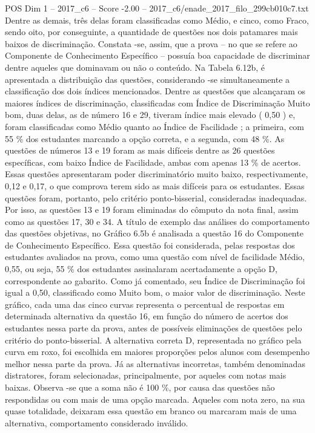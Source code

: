 \begin{textsample}{POS Dim 1 – 2017\_c6 – Score -2.00 – 2017\_c6/enade\_2017\_filo\_299cb010c7.txt}
Dentre as demais, três delas foram classificadas como Médio, e cinco, como Fraco, sendo oito, por conseguinte, a quantidade de questões nos dois patamares mais baixos de discriminação.
Constata -se, assim, que a prova – no que se refere ao Componente de Conhecimento Específico – possuía boa capacidade de discriminar dentre aqueles que dominavam ou não o conteúdo.
Na Tabela 6.12b, é apresentada a distribuição das questões, considerando -se simultaneamente a classificação dos dois índices mencionados.
Dentre as questões que alcançaram os maiores índices de discriminação, classificadas com Índice de Discriminação Muito bom, duas delas, as de número 16 e 29, tiveram índice mais elevado ( 0,50 ) e, foram classificadas como Médio quanto ao Índice de Facilidade ; a primeira, com 55 \% dos estudantes marcando a opção correta, e a segunda, com 48 \%.
As questões de números 13 e 19 foram as mais difíceis dentre as 26 questões específicas, com baixo Índice de Facilidade, ambas com apenas 13 \% de acertos.
Essas questões apresentaram poder discriminatório muito baixo, respectivamente, 0,12 e 0,17, o que comprova terem sido as mais difíceis para os estudantes.
Essas questões foram, portanto, pelo critério ponto-bisserial, consideradas inadequadas.
Por isso, as questões 13 e 19 foram eliminadas do cômputo da nota final, assim como as questões 17, 30 e 34.
A título de exemplo das análises do comportamento das questões objetivas, no Gráfico 6.5b é analisada a questão 16 do Componente de Conhecimento Específico.
Essa questão foi considerada, pelas respostas dos estudantes avaliados na prova, como uma questão com nível de facilidade Médio, 0,55, ou seja, 55 \% dos estudantes assinalaram acertadamente a opção D, correspondente ao gabarito.
Como já comentado, seu Índice de Discriminação foi igual a 0,50, classificado como Muito bom, o maior valor de discriminação.
Neste gráfico, cada uma das cinco curvas representa o percentual de respostas em determinada alternativa da questão 16, em função do número de acertos dos estudantes nessa parte da prova, antes de possíveis eliminações de questões pelo critério do ponto-bisserial.
A alternativa correta D, representada no gráfico pela curva em roxo, foi escolhida em maiores proporções pelos alunos com desempenho melhor nessa parte da prova.
Já as alternativas incorretas, também denominadas distratores, foram selecionadas, principalmente, por aqueles com notas mais baixas.
Observa -se que a soma não é 100 \%, por causa das questões não respondidas ou com mais de uma opção marcada.
Aqueles com nota zero, na sua quase totalidade, deixaram essa questão em branco ou marcaram mais de uma alternativa, comportamento considerado inválido.

\end{textsample}
